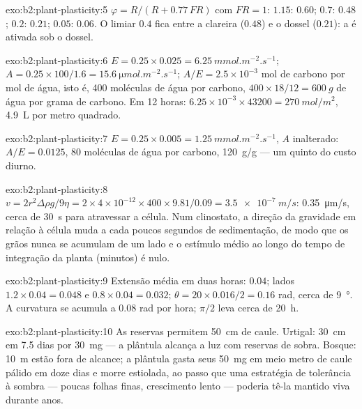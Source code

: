 \begin{solution}{exo:b2:plant-plasticity:5}
$\varphi = R/(R + 0.77\,FR)$ com $FR = 1$: $1.15$: $0.60$; $0.7$:
$0.48$; $0.2$: $0.21$; $0.05$: $0.06$. O limiar $0.4$ fica entre a
clareira ($0.48$) e o dossel ($0.21$): a  é ativada
sob o dossel.
\end{solution}

\begin{solution}{exo:b2:plant-plasticity:6}
$E = 0.25\times 0.025 = \qty{6.25}{mmol.m^{-2}.s^{-1}}$; $A =
0.25\times 100/1.6 = \qty{15.6}{\micro mol.m^{-2}.s^{-1}}$; $A/E =
2.5\times 10^{-3}$ mol de carbono por mol de água, isto é, 400
moléculas de água por carbono, $400\times 18/12 = \qty{600}{g}$ de água
por grama de carbono. Em 12 horas: $6.25\times 10^{-3}\times 43200 =
\qty{270}{mol/m^2}$, \qty{4.9}{L} por metro quadrado.
\end{solution}

\begin{solution}{exo:b2:plant-plasticity:7}
$E = 0.25\times 0.005 = \qty{1.25}{mmol.m^{-2}.s^{-1}}$, $A$
inalterado: $A/E = 0.0125$, 80 moléculas de água por carbono,
\qty{120}{g/g} --- um quinto do custo diurno.
\end{solution}

\begin{solution}{exo:b2:plant-plasticity:8}
$v = 2r^{2}\Delta\rho g/9\eta = 2\times 4\times 10^{-12}\times
400\times 9.81/0.09 = \qty{3.5e-7}{m/s}$: \qty{0.35}{\micro m/s},
cerca de \qty{30}{s} para atravessar a célula. Num clinostato, a
direção da gravidade em relação à célula muda a cada poucos segundos de
sedimentação, de modo que os grãos nunca se acumulam de um lado e o
estímulo médio ao longo do tempo de integração da planta (minutos) é
nulo.
\end{solution}

\begin{solution}{exo:b2:plant-plasticity:9}
Extensão média em duas horas: $0.04$; lados $1.2\times 0.04 = 0.048$
e $0.8\times 0.04 = 0.032$; $\theta = 20\times 0.016/2 = 0.16$
rad, cerca de \qty{9}{\degree}. A curvatura se acumula a $0.08$ rad por
hora; $\pi/2$ leva cerca de \qty{20}{h}.
\end{solution}

\begin{solution}{exo:b2:plant-plasticity:10}
As reservas permitem \qty{50}{cm} de caule. Urtigal: \qty{30}{cm} em
7.5 dias por \qty{30}{mg} --- a plântula alcança a luz com reservas de
sobra. Bosque: \qty{10}{m} estão fora de alcance; a plântula gasta seus
\qty{50}{mg} em meio metro de caule pálido em doze dias e morre
estiolada, ao passo que uma estratégia de tolerância à sombra --- poucas
folhas finas, crescimento lento --- poderia tê-la mantido viva durante
anos.
\end{solution}

